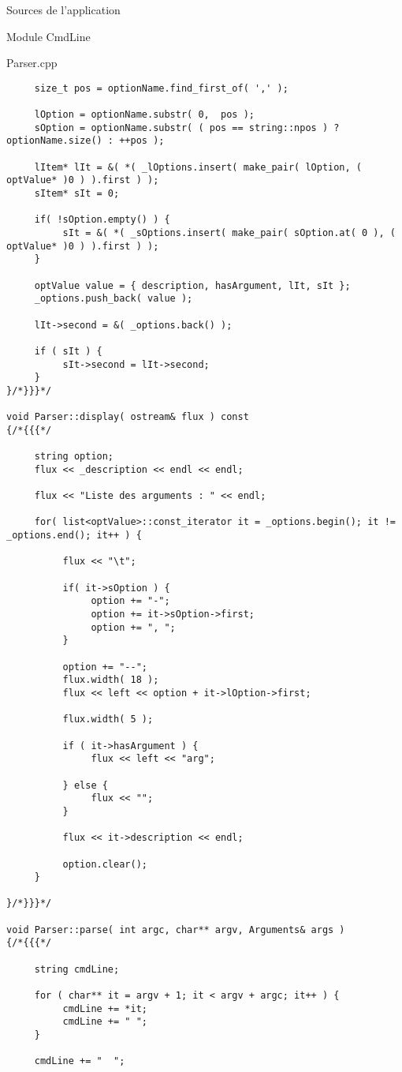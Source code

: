 \documentclass{article}
\begin{document}
\begin{section}{Sources de l'application}
\begin{subsection}{Module CmdLine}
\begin{paragraph}{Parser.cpp}
\begin{verbatim}
     size_t pos = optionName.find_first_of( ',' );

     lOption = optionName.substr( 0,  pos );
     sOption = optionName.substr( ( pos == string::npos ) ? optionName.size() : ++pos );

     lItem* lIt = &( *( _lOptions.insert( make_pair( lOption, ( optValue* )0 ) ).first ) );
     sItem* sIt = 0;

     if( !sOption.empty() ) {
          sIt = &( *( _sOptions.insert( make_pair( sOption.at( 0 ), ( optValue* )0 ) ).first ) );
     }

     optValue value = { description, hasArgument, lIt, sIt };
     _options.push_back( value );

     lIt->second = &( _options.back() );

     if ( sIt ) {
          sIt->second = lIt->second;
     }
}/*}}}*/

void Parser::display( ostream& flux ) const
{/*{{{*/

     string option;
     flux << _description << endl << endl;

     flux << "Liste des arguments : " << endl;

     for( list<optValue>::const_iterator it = _options.begin(); it != _options.end(); it++ ) {

          flux << "\t";

          if( it->sOption ) {
               option += "-";
               option += it->sOption->first;
               option += ", ";
          }

          option += "--";
          flux.width( 18 );
          flux << left << option + it->lOption->first;

          flux.width( 5 );

          if ( it->hasArgument ) {
               flux << left << "arg";

          } else {
               flux << "";
          }

          flux << it->description << endl;

          option.clear();
     }

}/*}}}*/

void Parser::parse( int argc, char** argv, Arguments& args )
{/*{{{*/

     string cmdLine;

     for ( char** it = argv + 1; it < argv + argc; it++ ) {
          cmdLine += *it;
          cmdLine += " ";
     }

     cmdLine += "  ";


\end{verbatim}
\end{paragraph}
\end{subsection}
\end{section}
\end{document}
